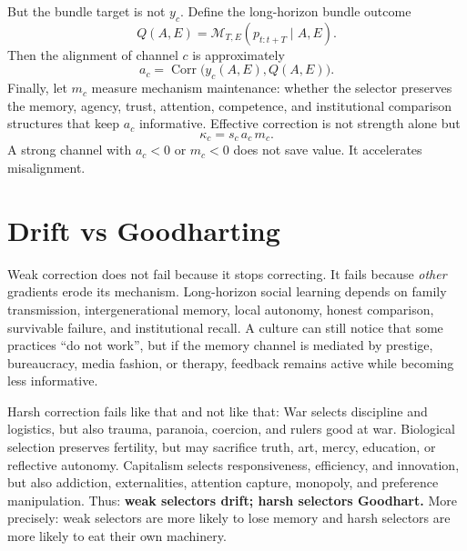 \documentclass[11pt]{article}
\begin{document}
But the bundle target is not $y_c$. Define the long-horizon bundle outcome
\begin{equation}
Q(A,E) = \mathcal M_{T,E}(p_{t:t+T}\mid A,E).
\end{equation}
Then the alignment of channel $c$ is approximately
\begin{equation}
a_c = \operatorname{Corr}\big(y_c(A,E), Q(A,E)\big).
\end{equation}
Finally, let $m_c$ measure mechanism maintenance: whether the selector preserves the memory, agency, trust, attention, competence, and institutional comparison structures that keep $a_c$ informative. 
Effective correction is not strength alone but
\begin{equation}
\kappa_c = s_c\, a_c\, m_c.
\end{equation}
A strong channel with $a_c<0$ or $m_c<0$ does not save value. It accelerates misalignment.

\section{Drift vs Goodharting}
Weak correction does not fail because it stops correcting. 
It fails because \emph{other} gradients erode its mechanism. 
Long-horizon social learning depends on family transmission, intergenerational memory, local autonomy, honest comparison, survivable failure, and institutional recall. 
A culture can still notice that some practices ``do not work'', but if the memory channel is mediated by prestige, bureaucracy, media fashion, or therapy, feedback remains active while becoming less informative.

Harsh correction fails like that and not like that: War selects discipline and logistics, but also trauma, paranoia, coercion, and rulers good at war. 
Biological selection preserves fertility, but may sacrifice truth, art, mercy, education, or reflective autonomy. 
Capitalism selects responsiveness, efficiency, and innovation, but also addiction, externalities, attention capture, monopoly, and preference manipulation. 
Thus: \textbf{weak selectors drift; harsh selectors Goodhart.}
More precisely: weak selectors are more likely to lose memory and harsh selectors are more likely to eat their own machinery.
\end{document}
